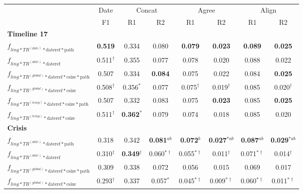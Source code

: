 \documentclass[a4paper,BCOR=10mm]{report}
\numberwithin{lemma}{chapter}
\numberwithin{definition}{chapter}
\begin{document}
\begin{table}
\begin{tabular}{|l|c|cc|cc|cc|}
\hline
 & Date & \multicolumn{ 2 }{|c|}{Concat} & \multicolumn{ 2 }{|c|}{Agree} & \multicolumn{ 2 }{|c|}{Align} \\
 & F1 & R1 & R2 & R1 & R2 & R1 & R2 \\\hline\hline
\multicolumn{8}{|l|}{ \textbf{Timeline 17}}\\\hline
$f_{ling*TR^{(date)}*\text{dateref}*\text{path}}$    & \textbf{0.519}   & 0.334 & 0.080 & \textbf{0.079}    & \textbf{0.023}    & \textbf{0.089}    & \textbf{0.025} \\\hline
$f_{ling*TR^{(date)}*\text{dateref}}$    & 0.511$^{\dagger}$    & 0.355 & 0.077 & 0.078 & 0.020 & 0.088 & 0.022 \\\hline
$f_{ling*TR^{(global)}*\text{dateref}*\text{csize}*\text{path}}$     & 0.507    & 0.334 & \textbf{0.084}    & 0.075 & 0.022 & 0.084 & \textbf{0.025} \\\hline
$f_{ling*TR^{(global)}*\text{dateref}*\text{csize}}$     & 0.508$^{\dagger}$    & 0.356$^{*}$   & 0.077 & 0.075$^{\dagger}$ & 0.019$^{\dagger}$ & 0.085 & 0.020$^{\dagger}$ \\\hline
$f_{ling*TR^{(temp)}*\text{dateref}*\text{csize}*\text{path}}$   & 0.507    & 0.332 & 0.083 & 0.075 & \textbf{0.023}    & 0.085 & \textbf{0.025} \\\hline
$f_{ling*TR^{(temp)}*\text{dateref}*\text{csize}}$   & 0.511$^{\dagger}$    & \textbf{0.362}$^{*}$  & 0.079 & 0.074 & 0.018 & 0.085 & 0.020 \\\hline
\hline\multicolumn{8}{|l|}{ \textbf{Crisis}}\\\hline
$f_{ling*TR^{(date)}*\text{dateref}*\text{path}}$    & 0.318    & 0.342 & \textbf{0.081}$^{ab}$ & \textbf{0.072}$^{b}$  & \textbf{0.027}$^{*ab}$    & \textbf{0.087}$^{ab}$ & \textbf{0.029}$^{*ab}$ \\\hline
$f_{ling*TR^{(date)}*\text{dateref}}$    & 0.310$^{\dagger}$    & \textbf{0.349}$^{\dagger}$    & 0.060$^{*\dagger}$    & 0.055$^{*\dagger}$    & 0.011$^{\dagger}$ & 0.071$^{*\dagger}$    & 0.014$^{\dagger}$ \\\hline
$f_{ling*TR^{(global)}*\text{dateref}*\text{csize}*\text{path}}$     & 0.309    & 0.338 & 0.072 & 0.056 & 0.015 & 0.069 & 0.017 \\\hline
$f_{ling*TR^{(global)}*\text{dateref}*\text{csize}}$     & 0.293$^{\dagger}$    & 0.337 & 0.057$^{*}$   & 0.045$^{*\dagger}$    & 0.009$^{*\dagger}$    & 0.060$^{*\dagger}$    & 0.011$^{*\dagger}$ \\\hline

\end{tabular}
\end{table}
\end{document}
